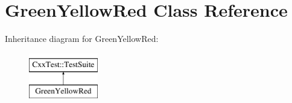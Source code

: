 \hypertarget{classGreenYellowRed}{\section{Green\-Yellow\-Red Class Reference}
\label{classGreenYellowRed}
}
Inheritance diagram for Green\-Yellow\-Red\-:\begin{figure}[H]
\begin{center}
\leavevmode
\includegraphics[height=2.000000cm]{classGreenYellowRed}
\end{center}
\end{figure}
